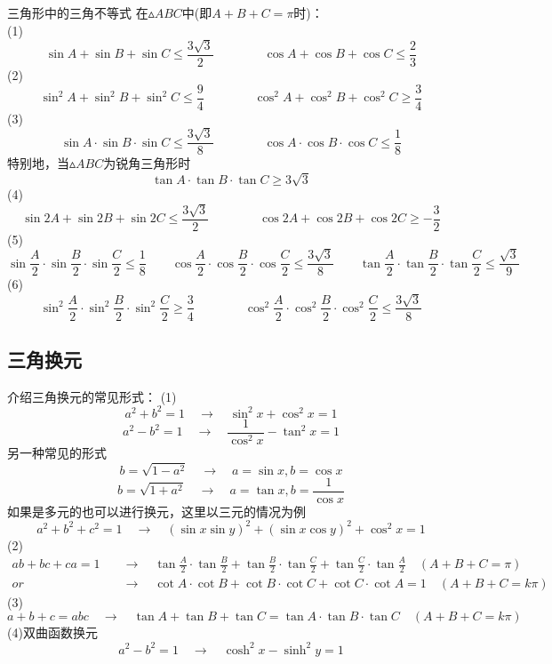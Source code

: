 \documentclass[lang=cn, zihao=5]{elegantbook}
\begin{document}
\begin{proposition}{三角形中的三角不等式} %
    在$\vartriangle ABC$中(即$A+B+C=\pi$时)：\\
    (1)$$\sin A + \sin B + \sin C \leq \frac{ 3\sqrt{3} }{2} \qquad \qquad \cos A + \cos B + \cos C \leq \frac{2}{3}$$
    (2)$$\sin ^2 A + \sin ^2 B + \sin ^2 C \leq \frac{9}{4} \qquad \qquad \cos ^2 A + \cos ^2 B + \cos ^2 C \geq \frac{3}{4}$$
    (3)$$\sin A \cdot \sin B \cdot \sin C \leq \frac{ 3\sqrt{3} }{8} \qquad \qquad \cos A \cdot \cos B \cdot \cos C \leq \frac{1}{8}$$
    特别地，当$\vartriangle ABC$为锐角三角形时
    $$\tan A \cdot \tan B \cdot \tan C \geq 3\sqrt{3}$$
    (4)
    $$\sin 2A + \sin 2B + \sin 2C \leq \frac{ 3\sqrt{3} }{2} \qquad \qquad \cos 2A + \cos 2B + \cos 2C \geq -\frac{3}{2}$$
    (5)
    $$\sin \frac{A}{2} \cdot \sin \frac{B}{2} \cdot \sin \frac{C}{2} \leq \frac{1}{8} \qquad \cos \frac{A}{2} \cdot \cos \frac{B}{2} \cdot \cos \frac{C}{2} \leq \frac{3 \sqrt{3}}{8} \qquad \tan \frac{A}{2} \cdot \tan \frac{B}{2} \cdot \tan \frac{C}{2} \leq \frac{\sqrt{3}}{9}$$
    (6)$$\sin ^2 \frac{A}{2} \cdot \sin ^2 \frac{B}{2} \cdot \sin ^2 \frac{C}{2} \geq \frac{3}{4} \qquad \qquad \cos ^2 \frac{A}{2} \cdot \cos ^2 \frac{B}{2} \cdot \cos ^2 \frac{C}{2} \leq \frac{3 \sqrt{3}}{8}$$
\end{proposition}

\subsection{三角换元}

介绍三角换元的常见形式：
    (1)
    $$a^2+b^2=1 \quad \longrightarrow \quad \sin^2{x}+\cos^2{x}=1$$
    $$a^2-b^2=1 \quad \longrightarrow \quad \frac{1}{\cos^2 x}-\tan^2 {x}=1$$
    另一种常见的形式
    $$b=\sqrt{1-a^2} \quad \longrightarrow \quad a=\sin{x} , b=\cos{x}$$
    $$b=\sqrt{1+a^2} \quad \longrightarrow \quad a=\tan{x} , b=\frac{1}{\cos{x}}$$
    如果是多元的也可以进行换元，这里以三元的情况为例
    $$a^2+b^2+c^2=1 \quad \longrightarrow \quad (\sin{x}\sin{y})^2+(\sin{x}\cos{y})^2+\cos^2{x}=1$$
    (2)
    \begin{align*}
        ab+bc+ca=1 \quad & \longrightarrow \quad \tan{\frac{A}{2}} \cdot \tan{\frac{B}{2}} + \tan{\frac{B}{2}} \cdot \tan{\frac{C}{2}} + \tan{\frac{C}{2}} \cdot \tan{\frac{A}{2}} \quad (A+B+C=\pi) \\
        or & \longrightarrow \quad \cot{A} \cdot \cot{B} + \cot{B} \cdot \cot{C} + \cot{C} \cdot \cot{A} = 1 \quad (A+B+C=k\pi)
    \end{align*}
    (3)$$a+b+c=abc \quad \longrightarrow \quad \tan{A}+\tan{B}+\tan{C}=\tan{A} \cdot \tan{B} \cdot \tan{C} \quad (A+B+C=k\pi)$$
    (4)双曲函数换元
    $$a^2-b^2=1 \quad \longrightarrow \quad \cosh^2{x}-\sinh^2{y}=1$$
\end{document}
